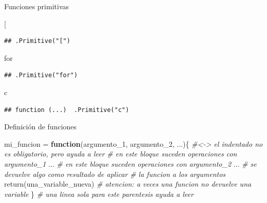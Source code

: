 \documentclass[
  ignorenonframetext,
]{beamer}
\newenvironment{Shaded}{\begin{snugshade}}{\end{snugshade}}
\newcommand{\AttributeTok}[1]{\textcolor[rgb]{0.77,0.63,0.00}{#1}}
\newcommand{\CommentTok}[1]{\textcolor[rgb]{0.56,0.35,0.01}{\textit{#1}}}
\newcommand{\ControlFlowTok}[1]{\textcolor[rgb]{0.13,0.29,0.53}{\textbf{#1}}}
\newcommand{\FunctionTok}[1]{\textcolor[rgb]{0.00,0.00,0.00}{#1}}
\newcommand{\NormalTok}[1]{#1}
\newcommand{\OtherTok}[1]{\textcolor[rgb]{0.56,0.35,0.01}{#1}}
\newcommand{\StringTok}[1]{\textcolor[rgb]{0.31,0.60,0.02}{#1}}
\begin{document}
\begin{frame}[fragile]{Funciones primitivas}
\protect\hypertarget{funciones-primitivas-1}{}
\begin{Shaded}
\begin{Highlighting}[]
\StringTok{\textasciigrave{}}\AttributeTok{[}\StringTok{\textasciigrave{}}
\end{Highlighting}
\end{Shaded}

\begin{verbatim}
## .Primitive("[")
\end{verbatim}

\begin{Shaded}
\begin{Highlighting}[]
\StringTok{\textasciigrave{}}\AttributeTok{for}\StringTok{\textasciigrave{}}
\end{Highlighting}
\end{Shaded}

\begin{verbatim}
## .Primitive("for")
\end{verbatim}

\begin{Shaded}
\begin{Highlighting}[]
\StringTok{\textasciigrave{}}\AttributeTok{c}\StringTok{\textasciigrave{}}
\end{Highlighting}
\end{Shaded}

\begin{verbatim}
## function (...)  .Primitive("c")
\end{verbatim}
\end{frame}

\begin{frame}[fragile]{Definición de funciones}
\protect\hypertarget{definiciuxf3n-de-funciones}{}
\begin{Shaded}
\begin{Highlighting}[]
\NormalTok{mi\_funcion }\OtherTok{=} \ControlFlowTok{function}\NormalTok{(argumento\_1, argumento\_2, ...)\{}
\CommentTok{\#\textless{}{-}\textgreater{} el indentado no es obligatorio, pero ayuda a leer  }
  \CommentTok{\# en este bloque suceden operaciones con argumento\_1}
\NormalTok{  ...}
  \CommentTok{\# en este bloque suceden operaciones con argumento\_2}
\NormalTok{  ...}
  \CommentTok{\# se devuelve algo como resultado de aplicar}
  \CommentTok{\# la funcion a los argumentos}
  \FunctionTok{return}\NormalTok{(una\_variable\_nueva) }\CommentTok{\# atencion: a veces una funcion no devuelve una variable}
\NormalTok{\} }\CommentTok{\# una linea sola para este parentesis ayuda a leer}
\end{Highlighting}
\end{Shaded}
\end{frame}
\end{document}
